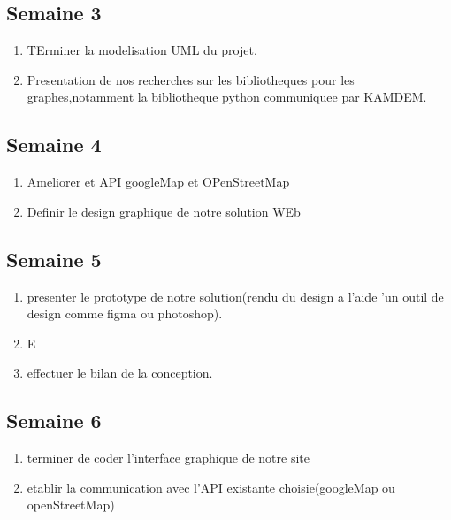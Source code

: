\documentclass{article}
\begin{document}


\subsection{Semaine 3}
\begin{enumerate}
    \item TErminer la modelisation UML du projet.
    
    \item Presentation de nos recherches sur les bibliotheques pour les graphes,notamment la bibliotheque python communiquee par KAMDEM. 
  
\end{enumerate}




\subsection{Semaine 4}
\begin{enumerate}
    \item Ameliorer et API googleMap et OPenStreetMap
    \item Definir le design graphique de notre solution WEb
    
\end{enumerate}


\subsection{Semaine 5}
\begin{enumerate}
    \item presenter le prototype de notre solution(rendu du design a l'aide 'un outil de design comme figma ou photoshop). 
    \item E
    \item effectuer le bilan de la conception.
\end{enumerate}


\subsection{Semaine 6}
\begin{enumerate}
    \item terminer de coder l'interface graphique de notre site
    \item etablir la communication avec l'API existante choisie(googleMap ou openStreetMap)
     
\end{enumerate}
\end{document}
